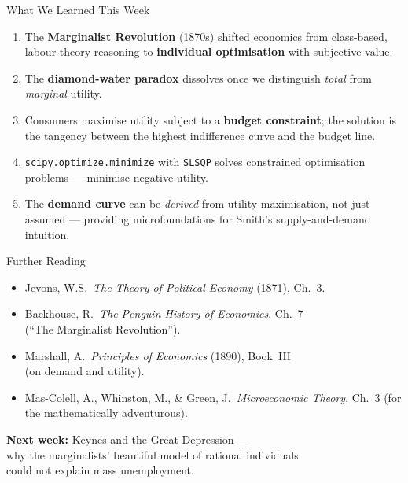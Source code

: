 \documentclass[aspectratio=169, 10pt]{beamer}
\begin{document}
\begin{frame}{What We Learned This Week}
\begin{enumerate}
  \item The \textbf{Marginalist Revolution} (1870s) shifted economics from
        class-based, labour-theory reasoning to \textbf{individual optimisation}
        with subjective value.
  \item The \textbf{diamond-water paradox} dissolves once we distinguish
        \textit{total} from \textit{marginal} utility.
  \item Consumers maximise utility subject to a \textbf{budget constraint};
        the solution is the tangency between the highest indifference curve
        and the budget line.
  \item \texttt{scipy.optimize.minimize} with \texttt{SLSQP} solves
        constrained optimisation problems --- minimise negative utility.
  \item The \textbf{demand curve} can be \textit{derived} from utility
        maximisation, not just assumed --- providing \alert{microfoundations}
        for Smith's supply-and-demand intuition.
\end{enumerate}
\end{frame}

\begin{frame}{Further Reading}
\begin{itemize}
  \item Jevons, W.S.\ \textit{The Theory of Political Economy} (1871), Ch.~3.
  \item Backhouse, R.\ \textit{The Penguin History of Economics}, Ch.~7\\
        (``The Marginalist Revolution'').
  \item Marshall, A.\ \textit{Principles of Economics} (1890), Book~III\\
        (on demand and utility).
  \item Mas-Colell, A., Whinston, M., \& Green, J.\ \textit{Microeconomic Theory},
        Ch.~3 (for the mathematically adventurous).
\end{itemize}
\vspace{1em}
\begin{center}
\textbf{Next week:} Keynes and the Great Depression ---\\
why the marginalists' beautiful model of rational individuals\\
could not explain mass unemployment.
\end{center}
\end{frame}
\end{document}
